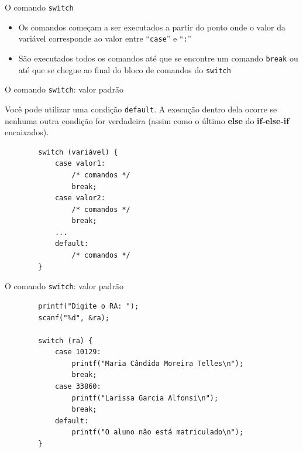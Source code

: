\documentclass[handout]{beamer}
\newcommand{\cod}[1]{\texttt{#1}}
\begin{document}
\begin{frame}[fragile]{O comando \texttt{switch}}

    \begin{itemize}
        \item Os comandos começam a ser executados a partir do ponto onde o valor da variável corresponde ao valor entre ``\cod{case}'' e ``\cod{:}''
        \item São executados todos os comandos até que se encontre um comando \cod{break} ou até que se chegue ao final do bloco de comandos do \cod{switch}
    \end{itemize}
\end{frame}

\begin{frame}[fragile]{O comando \texttt{switch}: valor padrão}

    Você pode utilizar uma condição \cod{default}.
    A execução dentro dela ocorre se nenhuma outra condição for verdadeira (assim como o último {\bf else} do {\bf if-else-if} encaixados).

    \begin{verbatim}
        switch (variável) {
            case valor1:
                /* comandos */
                break;
            case valor2:
                /* comandos */
                break;
            ...
            default:
                /* comandos */
        }
    \end{verbatim}
\end{frame}

\begin{frame}[fragile]{O comando \texttt{switch}: valor padrão}

    \begin{verbatim}
        printf("Digite o RA: ");
        scanf("%d", &ra);

        switch (ra) {
            case 10129:
                printf("Maria Cândida Moreira Telles\n");
                break;
            case 33860:
                printf("Larissa Garcia Alfonsi\n");
                break;
            default:
                printf("O aluno não está matriculado\n");
        }
    \end{verbatim}
\end{frame}


\end{document}
